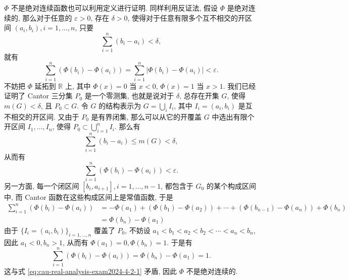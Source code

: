 \begin{solution}
\begin{enumerate}
    \(\Phi\) 不是绝对连续函数也可以利用定义进行证明. 同样利用反证法, 假设 \(\Phi\) 是绝对连续的,  那么对于任意的 \(\varepsilon > 0\), 存在 \(\delta > 0\), 使得对于任意有限多个互不相交的开区间 \((a_i, b_i), i = 1, \dots, n\), 只要
    \[\sum\limits_{i=1}^{n} (b_i - a_i) < \delta,\]
    就有
    \[\sum\limits_{i=1}^{n} (\Phi(b_i) - \Phi(a_i)) = \sum\limits_{i=1}^{n} \lvert \Phi(b_i) - \Phi(a_i) \rvert < \varepsilon.\]
    不妨把 \(\Phi\) 延拓到 \(\mathbb{R}\) 上, 其中 \(\Phi(x) = 0\) 当 \(x < 0\), \(\Phi(x) = 1\) 当 \(x > 1\). 我们已经证明了 Cantor 三分集 \(P_0\) 是一个零测集, 也就是说对于 \(\delta\), 总存在开集 \(G\), 使得 \(m(G) < \delta\), 且 \(P_0 \subset G\). 令 \(G\) 的结构表示为 \(G = \bigcup\limits_{i} I_i\), 其中 \(I_i = (a_i, b_i)\) 是互不相交的开区间. 又由于 \(P_0\) 是有界闭集, 那么可以从它的开覆盖 \(G\) 中选出有限个开区间 \(I_1, \dots, I_n\), 使得 \(P_0 \subset \bigcup\limits_{i=1}^{n} I_i\). 那么有
    \[\sum\limits_{i=1}^{n} (b_i - a_i) \leqslant m(G) < \delta,\]
    从而有
    \begin{equation}
    \label{eq:cau-real-analysis-exam2024-4-2-1}
    \sum\limits_{i=1}^{n} (\Phi(b_i) - \Phi(a_i)) < \varepsilon.
    \end{equation}
    另一方面, 每一个闭区间 \([b_i, a_{i+1}], i = 1, \dots, n-1\), 都包含于 \(G_0\) 的某个构成区间中, 而 Cantor 函数在这些构成区间上是常值函数, 于是
    \[\begin{aligned}
    \sum\limits_{i=1}^{n} (\Phi(b_i) - \Phi(a_i)) & = -\Phi(a_1) + (\Phi(b_1) - \Phi(a_2)) + \cdots + (\Phi(b_{n-1}) - \Phi(a_n)) + \Phi(b_n) \\
    & = \Phi(b_n) - \Phi(a_1)
    \end{aligned}\]
    由于 \(\{I_i = (a_i, b_i)\}_{i = 1, \dots, n}\) 覆盖了 \(P_0\), 不妨设 \(a_1 < b_1 < a_2 < b_2 < \cdots < a_n < b_n\), 因此 \(a_1 < 0, b_n > 1\), 从而有 \(\Phi(a_1) = 0, \Phi(b_n) = 1\). 于是有
    \[\sum\limits_{i=1}^{n} (\Phi(b_i) - \Phi(a_i)) = \Phi(b_n) - \Phi(a_1) = 1.\]
    这与式 \eqref{eq:cau-real-analysis-exam2024-4-2-1} 矛盾, 因此 \(\Phi\) 不是绝对连续的.
  \end{enumerate}
\end{solution}


